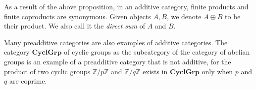 \documentclass[12pt]{article}
\begin{document}
As a result of the above proposition, in an additive category, finite products and finite coproducts are synonymous.  Given objects $A,B$, we denote $A\oplus B$ to be their product.  We also call it the \emph{direct sum} of $A$ and $B$.

Many preadditive categories are also examples of additive categories.  The category $\textbf{CyclGrp}$ of cyclic groups as the subcategory of the category of abelian groups is an example of a preadditive category that is not additive, for the product of two cyclic groups $\mathbb{Z}/p \mathbb{Z}$ and $\mathbb{Z}/q \mathbb{Z}$ exists in $\textbf{CyclGrp}$ only when $p$ and $q$ are coprime.

\end{document}
